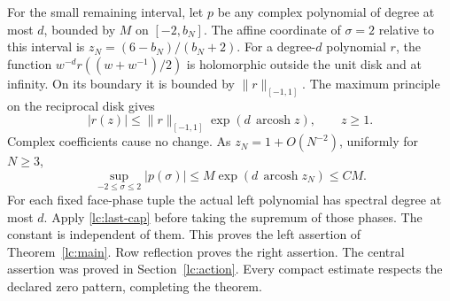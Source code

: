 For the small remaining interval, let \(p\) be any complex polynomial
of degree at most \(d\), bounded by \(M\) on \([-2,b_N]\).
The affine coordinate of \(\sigma=2\) relative to this interval is
\(z_N=(6-b_N)/(b_N+2)\).
For a degree-\(d\) polynomial \(r\), the function
\(w^{-d}r((w+w^{-1})/2)\) is holomorphic outside the unit disk and
at infinity. On its boundary it is bounded by \(\|r\|_{[-1,1]}\).
The maximum principle on the reciprocal disk gives
\[
 |r(z)|\le\|r\|_{[-1,1]}\exp(d\,\operatorname{arcosh}z),\qquad z\ge1.
\]
Complex coefficients cause no change. As \(z_N=1+O(N^{-2})\),
uniformly for \(N\ge3\),
\begin{equation}\label{lc:last-cap}
 \sup_{-2\le\sigma\le2}|p(\sigma)|
      \le M\exp(d\,\operatorname{arcosh}z_N)\le C M.
\end{equation}
For each fixed face-phase tuple the actual left polynomial has
spectral degree at most \(d\). Apply \eqref{lc:last-cap} before
taking the supremum of those phases. The constant is independent
of them. This proves the left assertion of Theorem~\ref{lc:main}.
Row reflection proves the right assertion. The central assertion
was proved in Section~\ref{lc:action}. Every compact estimate
respects the declared zero pattern, completing the theorem.

